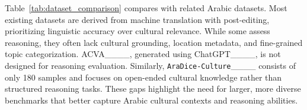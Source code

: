 Table~\ref{tab:dataset_comparison} compares \datasetname{} with related Arabic datasets. Most existing datasets are derived from machine translation with post-editing, prioritizing linguistic accuracy over cultural relevance. While some assess reasoning, they often lack cultural grounding, location metadata, and fine-grained topic categorization. ACVA____, generated using ChatGPT____, is not designed for reasoning evaluation. Similarly, \texttt{AraDice-Culture}____ consists of only 180 samples and focuses on open-ended cultural knowledge rather than structured reasoning tasks. These gaps highlight the need for larger, more diverse benchmarks that better capture Arabic cultural contexts and reasoning abilities.









